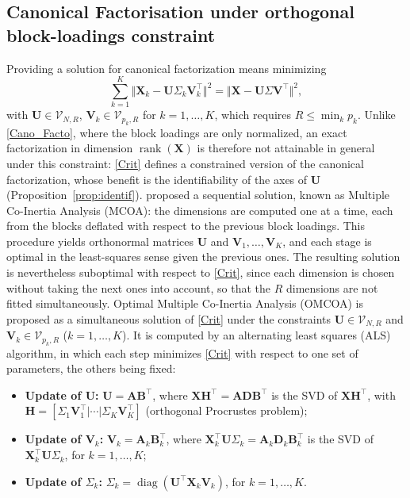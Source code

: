 \documentclass[11pt]{article}
\DeclareMathOperator{\diag}{diag}
\DeclareMathOperator{\rank}{rank}
\newcommand{\X}{\mathbf{X}}
\newcommand{\U}{\mathbf{U}}
\newcommand{\V}{\mathbf{V}}
\newcommand{\Stiefel}[2]{\mathcal V_{#1,#2}}
\begin{document}

\subsection{Canonical Factorisation under orthogonal block-loadings constraint}

Providing a solution for canonical factorization means minimizing
\begin{equation}
	\sum_{k=1}^K\Vert \X_k - \U\Sigma_k \V_k^\intercal\Vert^2= \Vert \X- \U \Sigma \V^\intercal\Vert^2, \label{Crit}
\end{equation}
with $\U\in\Stiefel{N}{R}$, $\V_k\in\Stiefel{p_k}{R}$ for $k=1,\ldots,K$, which requires $R\leq\min_kp_k$. Unlike \eqref{Cano_Facto}, where the block loadings are only normalized, an exact factorization in dimension $\rank(\X)$ is therefore not attainable in general under this constraint: \eqref{Crit} defines a constrained version of the canonical factorization, whose benefit is the identifiability of the axes of $\U$ (Proposition~\ref{prop:identif}).
\citet{chessel1996} proposed a sequential solution, known as Multiple Co-Inertia Analysis (MCOA): the dimensions are computed one at a time, each from the blocks deflated with respect to the previous block loadings. This procedure yields orthonormal matrices $\U$ and $\V_1,\ldots,\V_K$, and each stage is optimal in the
least-squares sense given the previous ones. The resulting solution is nevertheless suboptimal with respect to \eqref{Crit}, since each dimension is chosen without taking the next ones into account, so that the $R$ dimensions are not fitted simultaneously.
Optimal Multiple Co-Inertia Analysis (OMCOA) is proposed as a simultaneous solution of \eqref{Crit} under the constraints $\U\in \Stiefel{N}{R}$ and $\V_k\in \Stiefel{p_k}{R}$ ($k=1,\ldots,K$). It is computed by an alternating least squares (ALS) algorithm, in which each step minimizes \eqref{Crit} with respect to one set of parameters, the others being fixed:
\begin{itemize}
  \item \textbf{Update of $\U$:} $\U=\mathbf A\mathbf B^\intercal$, where $\X\mathbf H^\intercal=\mathbf A\mathbf D\mathbf B^\intercal$ is the SVD of
        $\X\mathbf H^\intercal$, with $\mathbf H=[\Sigma_1\V_1^\intercal|\cdots|\Sigma_K\V_K^\intercal]$ (orthogonal Procrustes problem);
  \item \textbf{Update of $\V_k$:} $\V_k=\mathbf A_k\mathbf B_k^\intercal$, where $\X_k^\intercal\U\Sigma_k=\mathbf A_k\mathbf D_k\mathbf B_k^\intercal$
        is the SVD of $\X_k^\intercal\U\Sigma_k$, for $k=1,\ldots,K$;
  \item \textbf{Update of $\Sigma_k$:} $\Sigma_k=\diag(\U^\intercal\X_k\V_k)$, for $k=1,\ldots,K$.
\end{itemize}
\end{document}

